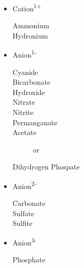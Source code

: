 \begin{itemize}
  \item Cation\textsuperscript{1+}
    \begin{description}
      \item[Ammonium] 
      \item[Hydronium] 
    \end{description}
  \item Anion\textsuperscript{1-}
    \begin{description}
      \item[Cyanide] 
      \item[Bicarbonate] 
      \item[Hydroxide] 
      \item[Nitrate] 
      \item[Nitrite] 
      \item[Permanganate] 
      \item[Acetate]  or 
      \item[Dihydrogen Phospate] 
    \end{description}
  \item Anion\textsuperscript{2-}
    \begin{description}
      \item[Carbonate] 
      \item[Sulfate] 
      \item[Sulfite] 
    \end{description}
  \item Anion\textsuperscript{3-}
    \begin{description}
      \item[Phosphate] 
    \end{description}
\end{itemize}
